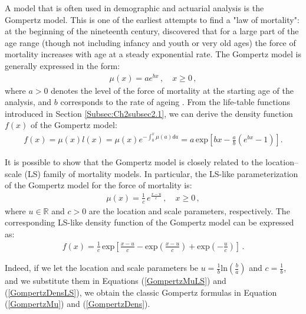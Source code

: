 \documentclass[Thesis]{subfiles}
\begin{document}
A model that is often used in demographic and actuarial analysis is the Gompertz model. This is one of the earliest attempts to find a "law of mortality": at the beginning of the nineteenth century, \cite{gompertz1825nature} discovered that for a large part of the age range (though not including infancy and youth or very old ages) the force of mortality increases with age at a steady exponential rate. The Gompertz model is generally expressed in the form:
\begin{eqnarray}\label{GompertzMu}
\mu (x)=ae^{bx} \, , \quad x \geq 0  \, ,
\end{eqnarray}
where $a > 0$ denotes the level of the force of mortality at the starting age of the analysis, and $b$ corresponds to the rate of ageing \citep{thatcher1998force}. From the life-table functions introduced in Section \ref{Subsec:Ch2subsec2.1}, we can derive the density function $f(x)$ of the Gompertz model:
\begin{eqnarray}\label{GompertzDens}
f(x) = \mu (x)l(x) = \mu (x) e^{- \int_{0}^{x} \mu (a)da}  = a \, \mathrm{exp} \left [ bx -\frac{a}{b} (e^{bx}-1) \right ] .
\end{eqnarray}

It is possible to show that the Gompertz model is closely related to the location--scale (LS) family of mortality models. In particular, the LS-like parameterization of the Gompertz model for the force of mortality is: 
\begin{eqnarray}\label{GompertzMuLS}
\mu(x) = \frac{1}{c} \, e^{\frac{x-u}{c}} \, , \quad x \geq 0 \, ,  
\end{eqnarray}
where $u \in \mathbb{R}$ and $c > 0$ are the location and scale parameters, respectively. The corresponding LS-like density function of the Gompertz model can be expressed as:
\begin{eqnarray}\label{GompertzDensLS}
f(x) = \frac{1}{c}\,\mathrm{exp} \left [ \frac{x-u}{c} - \mathrm{exp} \left ( \frac{x-u}{c} \right ) + \mathrm{exp} \left ( - \frac{u}{c} \right ) \right ]   \, .
\end{eqnarray}

Indeed, if we let the location and scale parameters be $u =  \frac{1}{b} \mathrm{ln} \left ( \frac{b}{a} \right )$ and $c=\frac{1}{b}$, and we substitute them in Equations (\ref{GompertzMuLS}) and (\ref{GompertzDensLS}), we obtain the classic Gompertz formulas in Equation (\ref{GompertzMu}) and (\ref{GompertzDens}). 
\end{document}
